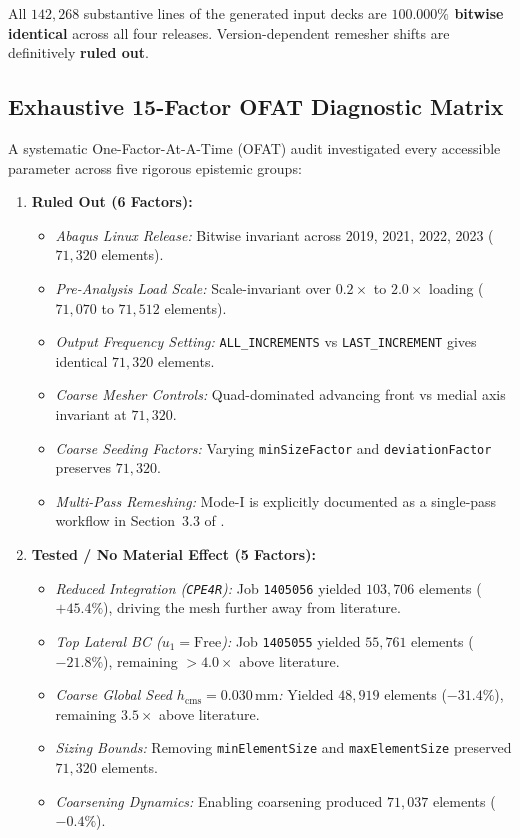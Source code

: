 All $142{,}268$ substantive lines of the generated input decks are \textbf{$100.000\%$ bitwise identical} across all four releases. Version-dependent remesher shifts are definitively \textbf{ruled out}.

\subsection{Exhaustive 15-Factor OFAT Diagnostic Matrix}
A systematic One-Factor-At-A-Time (OFAT) audit investigated every accessible parameter across five rigorous epistemic groups:

\begin{enumerate}[leftmargin=4mm,itemsep=1pt,topsep=1pt]
  \item \textbf{Ruled Out (6 Factors):}
  \begin{itemize}[itemsep=0.5pt]
    \item \emph{Abaqus Linux Release:} Bitwise invariant across 2019, 2021, 2022, 2023 ($71{,}320$ elements).
    \item \emph{Pre-Analysis Load Scale:} Scale-invariant over $0.2\times$ to $2.0\times$ loading ($71{,}070$ to $71{,}512$ elements).
    \item \emph{Output Frequency Setting:} \texttt{ALL\_INCREMENTS} vs \texttt{LAST\_INCREMENT} gives identical $71{,}320$ elements.
    \item \emph{Coarse Mesher Controls:} Quad-dominated advancing front vs medial axis invariant at $71{,}320$.
    \item \emph{Coarse Seeding Factors:} Varying \texttt{minSizeFactor} and \texttt{deviationFactor} preserves $71{,}320$.
    \item \emph{Multi-Pass Remeshing:} Mode-I is explicitly documented as a single-pass workflow in Section~3.3 of \citep{Pandey2025}.
  \end{itemize}

  \item \textbf{Tested / No Material Effect (5 Factors):}
  \begin{itemize}[itemsep=0.5pt]
    \item \emph{Reduced Integration (\texttt{CPE4R}):} Job \texttt{1405056} yielded $103{,}706$ elements ($+45.4\%$), driving the mesh further away from literature.
    \item \emph{Top Lateral BC ($u_1 = \mathrm{Free}$):} Job \texttt{1405055} yielded $55{,}761$ elements ($-21.8\%$), remaining $>4.0\times$ above literature.
    \item \emph{Coarse Global Seed $h_{\mathrm{cms}} = 0.030\,\mathrm{mm}$:} Yielded $48{,}919$ elements ($-31.4\%$), remaining $3.5\times$ above literature.
    \item \emph{Sizing Bounds:} Removing \texttt{minElementSize} and \texttt{maxElementSize} preserved $71{,}320$ elements.
    \item \emph{Coarsening Dynamics:} Enabling coarsening produced $71{,}037$ elements ($-0.4\%$).
  \end{itemize}


\end{enumerate}
